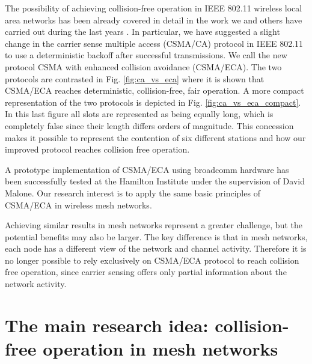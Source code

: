 \documentclass[a4paper,twocolumns]{article}%
\begin{document}
The possibility of achieving collision-free operation in IEEE 802.11 wireless local area networks has been already covered in detail in the work we and others have carried out during the last years \cite{barcelo2008lba,bellalta2009vtc,barcelo2009tpc,barcelo2010fcc,barcelo2011tcf,barcelo2011cfo,he2009sbr,fang2010dlm}.
In particular, we have suggested a slight change in the carrier sense multiple access (CSMA/CA) protocol in IEEE 802.11 to use a deterministic backoff after successful transmissions.
We call the new protocol CSMA with enhanced collision avoidance (CSMA/ECA).
The two protocols are contrasted in Fig. \ref{fig:ca_vs_eca} where it is shown that CSMA/ECA reaches deterministic, collision-free, fair operation.
A more compact representation of the two protocols is depicted in Fig. \ref{fig:ca_vs_eca_compact}.
In this last figure all slots are represented as being equally long, which is completely false since their length differs orders of magnitude.
This concession makes it possible to represent the contention of six different stations and how our improved protocol reaches collision free operation.

A prototype implementation of CSMA/ECA using broadcomm hardware has been successfully tested at the Hamilton Institute under the supervision of David Malone.
Our research interest is to apply the same basic principles of CSMA/ECA in wireless mesh networks.

Achieving similar results in mesh networks represent a greater challenge, but the potential benefits may also be larger.
The key difference is that in mesh networks, each node has a different view of the network and channel activity.
Therefore it is no longer possible to rely exclusively on CSMA/ECA protocol to reach collision free operation, since carrier sensing offers only partial information about the network activity.




\section{The main research idea: collision-free operation in mesh networks}
\end{document}

